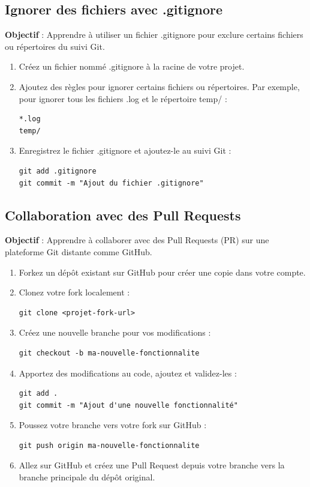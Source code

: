 \subsection*{Ignorer des fichiers avec .gitignore}
{}
\noindent \textbf{Objectif} : Apprendre à utiliser un fichier .gitignore pour exclure certains fichiers ou répertoires du suivi Git.

\begin{enumerate}
	\item Créez un fichier nommé .gitignore à la racine de votre projet.
	\item Ajoutez des règles pour ignorer certains fichiers ou répertoires. Par exemple, pour ignorer tous les fichiers .log et le répertoire temp/ :
	\begin{verbatim}
*.log
temp/
	\end{verbatim}
	\item Enregistrez le fichier .gitignore et ajoutez-le au suivi Git :
	\begin{verbatim}
git add .gitignore
git commit -m "Ajout du fichier .gitignore"
	\end{verbatim}
\end{enumerate}

\subsection*{Collaboration avec des Pull Requests}
{}
\noindent \textbf{Objectif} : Apprendre à collaborer avec des Pull Requests (PR) sur une plateforme Git distante comme GitHub.

\begin{enumerate}
	\item Forkez un dépôt existant sur GitHub pour créer une copie dans votre compte.
	\item Clonez votre fork localement :
	\begin{verbatim}
git clone <projet-fork-url>
	\end{verbatim}
	\item Créez une nouvelle branche pour vos modifications :
	\begin{verbatim}
git checkout -b ma-nouvelle-fonctionnalite
	\end{verbatim}
	\item Apportez des modifications au code, ajoutez et validez-les :
	\begin{verbatim}
git add .
git commit -m "Ajout d'une nouvelle fonctionnalité"
	\end{verbatim}
	\newpage
	\item Poussez votre branche vers votre fork sur GitHub :
	\begin{verbatim}
git push origin ma-nouvelle-fonctionnalite
	\end{verbatim}
	\item Allez sur GitHub et créez une Pull Request depuis votre branche vers la branche principale du dépôt original.
\end{enumerate}

